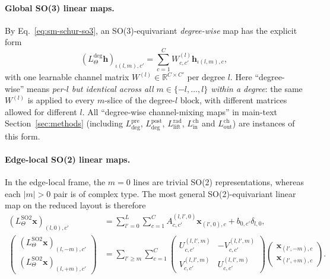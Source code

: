 \paragraph{Global SO(3) linear maps.}
By Eq.~\eqref{eq:sm-schur-so3}, an SO(3)-equivariant \emph{degree-wise} map
has the explicit form
\begin{equation}
    (L^{\mathrm{deg}}_{\Theta}\mathbf{h})_{\iota(l,m),c'}
    =
    \sum_{c=1}^{C}
    W^{(l)}_{c,c'}\mathbf{h}_{\iota(l,m),c}, \label{eq:sm-degree-linear} \end{equation} with one learnable channel matrix $W^{(l)}\in\mathbb{R}^{C\times C'}$ per degree $l$.
Here ``degree-wise'' means \emph{per-$l$ but identical across all $m\in\{-l,\ldots,l\}$ within a degree}: the same $W^{(l)}$ is applied to every $m$-slice of the degree-$l$ block, with different matrices allowed for different $l$.
All ``degree-wise channel-mixing maps'' in main-text Section~\ref{sec:methods} (including $L^{\mathrm{pre}}_{\mathrm{deg}}$, $L^{\mathrm{post}}_{\mathrm{deg}}$, $L^{\mathrm{rad}}_{\mathrm{lift}}$, $L^{\mathrm{ch}}_{\mathrm{in}}$ and $L^{\mathrm{ch}}_{\mathrm{out}}$) are instances of this form.

\paragraph{Edge-local SO(2) linear maps.}
In the edge-local frame, the $m=0$ lines are trivial SO(2) representations, whereas each $|m|>0$ pair is of complex type.
The most general SO(2)-equivariant
linear map on the reduced layout is therefore
\begin{align}
    (L_{\Theta}^{\mathrm{SO2}}\mathbf{x})_{(l,0),c'}
     & =
    \sum_{l'=0}^{L}\sum_{c=1}^{C}
    A_{c,c'}^{(l,l',0)}\mathbf{x}_{(l',0),c}
    +b_{0,c'}\delta_{l,0},
    \label{eq:sm-so2-m0} \\
    \begin{pmatrix}
        (L_{\Theta}^{\mathrm{SO2}}\mathbf{x})_{(l,-m),c'}\\
        (L_{\Theta}^{\mathrm{SO2}}\mathbf{x})_{(l,+m),c'}
    \end{pmatrix}
     & =
    \sum_{l'\ge m}\sum_{c=1}^{C}
    \begin{pmatrix}
        U_{c,c'}^{(l,l',m)} & -V_{c,c'}^{(l,l',m)} \\
        V_{c,c'}^{(l,l',m)} & U_{c,c'}^{(l,l',m)}
    \end{pmatrix}
    \begin{pmatrix}
        \mathbf{x}_{(l',-m),c} \\
        \mathbf{x}_{(l',+m),c}
    \end{pmatrix}.
    \label{eq:sm-so2-mn}
\end{align}

